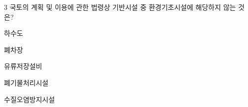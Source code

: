 \begin{question}{3}
국토의 계획 및 이용에 관한 법령상 기반시설 중 환경기초시설에 해당하지 않는 것은?
\begin{choices}
  \item 하수도
  \item 폐차장
  \item 유류저장설비
  \item 폐기물처리시설
  \item 수질오염방지시설
\end{choices}
\end{question}
